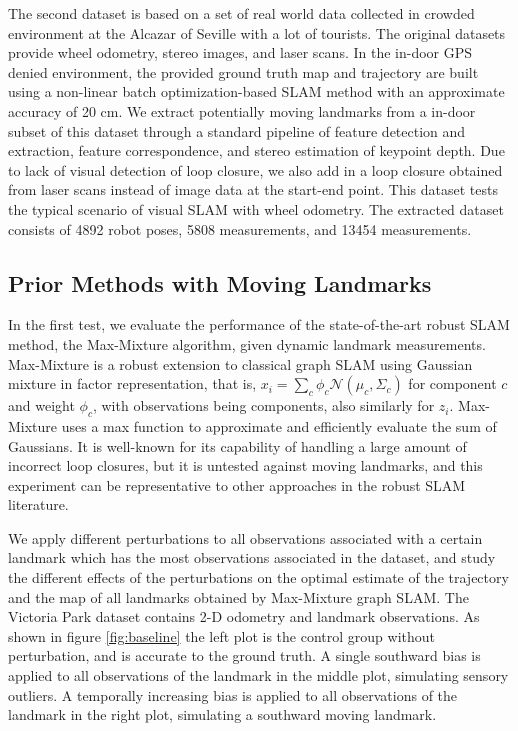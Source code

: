 The second dataset is based on a set of real world data collected in crowded
environment at the Alcazar of Seville with a lot of tourists.\cite{iros14-frog}
The original datasets provide wheel odometry, stereo images, and laser scans.
In the in-door GPS denied environment, the provided ground truth map and
trajectory are built using a non-linear batch optimization-based SLAM method
with an approximate accuracy of 20 cm. We extract potentially moving landmarks
from a in-door subset of this dataset through a standard pipeline of feature
detection and extraction, feature correspondence, and stereo estimation of
keypoint depth.  Due to lack of visual detection of loop closure, we also add
in a loop closure obtained from laser scans instead of image data at the
start-end point. This dataset tests the typical scenario of visual SLAM with
wheel odometry. The extracted dataset consists of 4892 robot poses, 5808
measurements, and 13454 measurements.

\subsection{Prior Methods with Moving Landmarks}

In the first test, we evaluate the performance of the state-of-the-art robust
SLAM method, the Max-Mixture algorithm, given dynamic landmark measurements.
Max-Mixture is a robust extension to classical graph SLAM using Gaussian
mixture in factor representation, that is, $ x_i = \sum_c \phi_c
\mathcal{N}(\mu_c, \Sigma_c)$ for component $c$ and weight $\phi_c$, with
observations being components, also similarly for $z_i$. Max-Mixture uses a max
function to approximate and efficiently evaluate the sum of Gaussians. It is
well-known for its capability of handling a large amount of incorrect loop
closures, but it is untested against moving landmarks, and this experiment can
be representative to other approaches in the robust SLAM literature. 

We apply different perturbations to all observations associated with a certain
landmark which has the most observations associated in the dataset, and study
the different effects of the perturbations on the optimal estimate of the
trajectory and the map of all landmarks obtained by Max-Mixture graph SLAM. The
Victoria Park dataset contains 2-D odometry and landmark observations. As shown
in figure \ref{fig:baseline} the left plot is the control group without
perturbation, and is accurate to the ground truth. A single southward bias is
applied to all observations of the landmark in the middle plot, simulating
sensory outliers. A temporally increasing bias is applied to all observations
of the landmark in the right plot, simulating a southward moving landmark.

